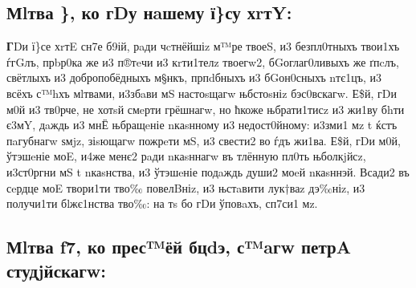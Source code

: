 \subsection{Мlтва \}, ко гDу нaшему ї\}су
    хrтY:}

\textbf{Г}Dи ї\}се хrтE сн7е б9ій, рaди чcтнёйшіz м™ре твоеS, и3 безпл0тныхъ
твои1хъ ѓгGлъ, прbр0ка же и3 п®тeчи и3 кrти1телz твоегw2, бGоглаг0ливыхъ
же ґпcлъ, свётлыхъ и3 добропобёдныхъ м§нкъ, прпdбныхъ и3 бGон0сныхъ
nтє1цъ, и3 всёхъ с™hхъ мlтвами, и3збaви мS настоsщагw њбстоsніz
бэс0вскагw. Е\$й, гDи м0й и3 тв0рче, не хотsй смeрти грёшнагw, но ћкоже
њбрати1тисz и3 жи1ву бhти є3мY, дaждь и3 мнЁ њбращeніе nкаsнному и3
недост0йному: и3зми1 мz t ќстъ пaгубнагw ѕмjz, зіsющагw пожрeти мS, и3
свести2 во ѓдъ жи1ва. Е\$й, гDи м0й, ўтэшeніе моE, и4же менє2 рaди
nкаsннагw въ тлённую пл0ть њболкjйсz, и3ст0ргни мS t nкаsнства, и3
ўтэшeніе подaждь души2 моeй nкаsннэй. Всади2 въ сeрдце моE твори1ти тво‰
повелBніz, и3 њстaвити лук†ваz дэ‰ніz, и3 получи1ти бlжє1нства тво‰: на
тs бо гDи ўповaхъ, сп7си1 мz.

\subsection{Мlтва f7, ко прес™ёй бцdэ, с™aгw петрA студjйскагw:}

